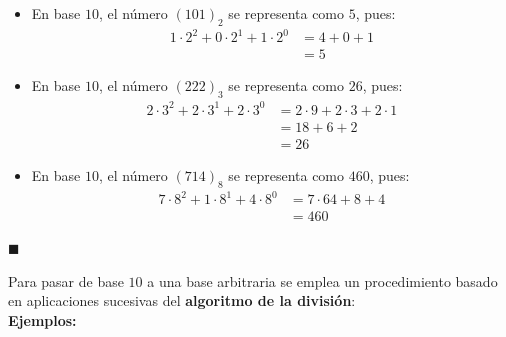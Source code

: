 \documentclass[10 pt]{article}
\begin{document}
\begin{itemize}
    \item \Large{En base $10$, el número $(101)_2$ se representa como $5$, pues:}
    \begin{align*}
        1 \cdot 2^2+0 \cdot 2^1+1 \cdot 2^0&=4+0+1 \\
        &=5
    \end{align*}
    \item \Large{En base $10$, el número $(222)_3$ se representa como $26$, pues:}
    \begin{align*}
        2 \cdot 3^2+2 \cdot 3^1+2 \cdot 3^0&=2 \cdot 9+2 \cdot 3+2 \cdot 1 \\
        &=18+6+2 \\
        &=26
    \end{align*}
    \item \Large{En base $10$, el número $(714)_8$ se representa como $460$, pues:}
    \begin{align*}
        7 \cdot 8^2+1 \cdot 8^1+4 \cdot 8^0&=7 \cdot 64+8+4 \\
        &=460
    \end{align*}
\end{itemize}

\begin{flushright}
    $\blacksquare$
\end{flushright}

\Large{Para pasar de base $10$ a una base arbitraria se emplea un procedimiento basado en aplicaciones sucesivas del \textbf{algoritmo de la división}:} \\

\Large{\textbf{Ejemplos:}} \\
\end{document}
